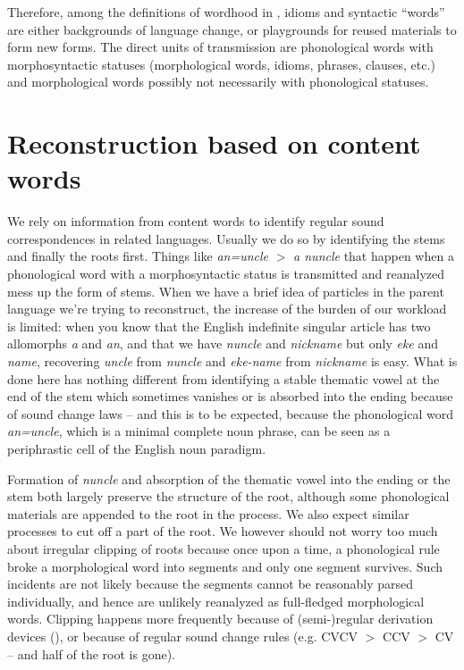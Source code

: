 \documentclass[a4paper, oneside, scheme=plain, 12pt]{article}
\newcommand{\form}[1]{\emph{#1}}
\newcommand*{\textgt}{$>$ }
\begin{document}
Therefore, among the definitions of wordhood in ,
idioms and syntactic ``words'' are either backgrounds of language change,
or playgrounds for reused materials to form new forms.
The direct units of transmission are phonological words with morphosyntactic statuses
(morphological words, idioms, phrases, clauses, etc.)
and morphological words possibly not necessarily with phonological statuses.

\section{Reconstruction based on content words}

We rely on information from content words to identify regular sound correspondences in related languages.
Usually we do so by identifying the stems and finally the roots first.
Things like \form{an=uncle} \textgt \form{a nuncle} that happen
when a phonological word with a morphosyntactic status is transmitted and reanalyzed mess up the form of stems.
When we have a brief idea of particles in the parent language we're trying to reconstruct,
the increase of the burden of our workload is limited:
when you know that the English indefinite singular article has two allomorphs \form{a} and \form{an},
and that we have \form{nuncle} and \form{nickname} but only \form{eke} and \form{name},
recovering \form{uncle} from \form{nuncle} and \form{eke-name} from \form{nickname} is easy.
What is done here has nothing different from identifying a stable thematic vowel
at the end of the stem which sometimes vanishes or is absorbed into the ending because of sound change laws
-- and this is to be expected, because
the phonological word \form{an=uncle}, which is a minimal complete noun phrase,
can be seen as a periphrastic cell of the English noun paradigm.

Formation of \form{nuncle} and absorption of the thematic vowel into the ending or the stem
both largely preserve the structure of the root,
although some phonological materials are appended to the root in the process.
We also expect similar processes to cut off a part of the root.
We however should not worry too much about irregular clipping of roots
because once upon a time, a phonological rule broke a morphological word into segments
and only one segment survives.
Such incidents are not likely because the segments cannot be reasonably parsed individually,
and hence are unlikely reanalyzed as full-fledged morphological words.
Clipping happens more frequently because of (semi-)regular derivation devices
(),
or because of regular sound change rules
(e.g. CVCV \textgt CCV \textgt CV -- and half of the root is gone).
\end{document}
